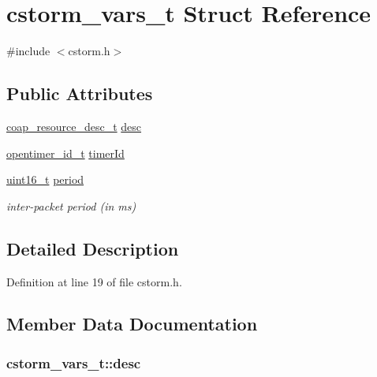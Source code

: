 \hypertarget{structcstorm__vars__t}{}\section{cstorm\+\_\+vars\+\_\+t Struct Reference}
\label{structcstorm__vars__t}


{\ttfamily \#include $<$cstorm.\+h$>$}

\subsection*{Public Attributes}
\begin{DoxyCompactItemize}
\item 
\hyperlink{structcoap__resource__desc__t}{coap\+\_\+resource\+\_\+desc\+\_\+t} \hyperlink{structcstorm__vars__t_a25f796d5f825bbdc88b74044d9186b05}{desc}
\item 
\hyperlink{group___open_timers_gae5ca9e65d270cdfa4bc74008d96d69ab}{opentimer\+\_\+id\+\_\+t} \hyperlink{structcstorm__vars__t_a3c0653b7f890a8aa7728e3d7f044a51f}{timer\+Id}
\item 
\hyperlink{_p_e___types_8h_a1f1825b69244eb3ad2c7165ddc99c956}{uint16\+\_\+t} \hyperlink{structcstorm__vars__t_a987c7fc2180adf20acbb33ff02924b39}{period}
\begin{DoxyCompactList}\small\item\em inter-\/packet period (in ms) \end{DoxyCompactList}\end{DoxyCompactItemize}


\subsection{Detailed Description}


Definition at line 19 of file cstorm.\+h.



\subsection{Member Data Documentation}
\subsubsection[{\texorpdfstring{desc}{desc}}]{ cstorm\+\_\+vars\+\_\+t\+::desc}\hypertarget{structcstorm__vars__t_a25f796d5f825bbdc88b74044d9186b05}{}\label{structcstorm__vars__t_a25f796d5f825bbdc88b74044d9186b05}


